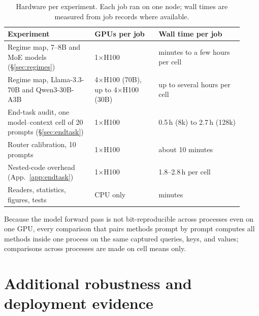 \begin{table}[h]
\centering
\small
\setlength{\tabcolsep}{4pt}
\caption{Hardware per experiment.  Each job ran on one node; wall times are
measured from job records where available.}
\label{tab:app-compute}
\begin{tabular}{@{}p{0.34\linewidth}p{0.25\linewidth}p{0.33\linewidth}@{}}
\toprule
\textbf{Experiment} & \textbf{GPUs per job} & \textbf{Wall time per job} \\
\midrule
Regime map, 7--8B and MoE models (\S\ref{sec:regimes}) & 1$\times$H100 & minutes to a few hours per cell \\
Regime map, Llama-3.3-70B and Qwen3-30B-A3B & 4$\times$H100 (70B), up to 4$\times$H100 (30B) & up to several hours per cell \\
End-task audit, one model--context cell of 20 prompts (\S\ref{sec:endtask}) & 1$\times$H100 & 0.5\,h (8k) to 2.7\,h (128k) \\
Router calibration, 10 prompts & 1$\times$H100 & about 10 minutes \\
Nested-code overhead (App.~\ref{app:endtask}) & 1$\times$H100 & 1.8--2.8\,h per cell \\
Readers, statistics, figures, tests & CPU only & minutes \\
\bottomrule
\end{tabular}
\end{table}

Because the model forward pass is not bit-reproducible across processes even on
one GPU, every comparison that pairs methods prompt by prompt computes all
methods inside one process on the same captured queries, keys, and values;
comparisons across processes are made on cell means only.

\section{Additional robustness and deployment evidence}
\label{app:robustness}

